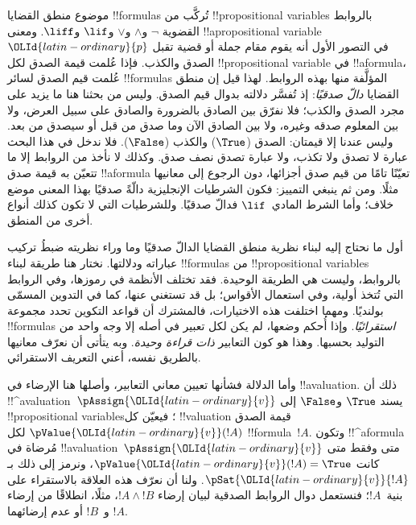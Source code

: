 \documentclass[../../../include/open-logic-section]{subfiles}
\begin{document}


موضوع منطق القضايا !!{formula}s تُركَّب من
!!{propositional variable}s بالروابط القضوية
$\lnot$ و$\land$ و$\lor$ و$\lif$ و$\liff$. ومعنى
!!a{propositional variable}~${\OLId{latin-ordinary}{p}}$ في التصور الأول أنه يقوم مقام جملة أو قضية تقبل الصدق والكذب.
فإذا عُلمت قيمة الصدق لكل !!{propositional variable} في
!!a{formula}، عُلمت قيم الصدق لسائر !!{formula}s المؤلَّفة منها بهذه الروابط. لهذا قيل إن منطق القضايا
\emph{دالّ صدقيًا}: إذ تُفسَّر دلالته بدوال قيم الصدق. وليس من بحثنا هنا ما يزيد على مجرد الصدق والكذب؛ فلا نفرّق بين الصادق بالضرورة والصادق على سبيل العرض، ولا بين المعلوم صدقه وغيره، ولا بين الصادق الآن وما صدق من قبل أو سيصدق من بعد. وليس عندنا إلا قيمتان: الصدق
($\True$) والكذب ($\False$). فلا ندخل في هذا البحث عبارة لا تصدق ولا تكذب، ولا عبارة تصدق نصف صدق.
وكذلك لا نأخذ من الروابط إلا ما تتعيّن به قيمة صدق
!!a{formula} تعيّنًا تامًا من قيم صدق أجزائها، دون الرجوع إلى معانيها مثلًا. ومن ثم ينبغي التمييز: فكون الشرطيات الإنجليزية دالّةً صدقيًا بهذا المعنى موضع خلاف؛ وأما الشرط المادي~$\lif$ فدالّ صدقيًا. وللشرطيات التي لا تكون كذلك أنواع أخرى من المنطق.

أول ما نحتاج إليه لبناء نظرية منطق القضايا الدالّ صدقيًا وما وراء نظريته ضبطُ تركيب عباراته ودلالتها. نختار هنا طريقة لبناء
!!{formula}s من !!{propositional variable}s بالروابط، وليست هي الطريقة الوحيدة. فقد تختلف الأنظمة في رموزها، وفي الروابط التي تُتخذ أولية، وفي استعمال الأقواس؛ بل قد تستغني عنها، كما في التدوين المسمّى بولنديًا.
ومهما اختلفت هذه الاختيارات، فالمشترك أن قواعد التكوين تحدد مجموعة
!!{formula}s \emph{استقرائيًا}. وإذا أُحكم وضعها، لم يكن لكل تعبير في أصله إلا وجه واحد من التوليد بحسبها. وهذا هو كون التعابير
\emph{ذات قراءة وحيدة}. وبه يتأتى أن نعرّف معانيها بالطريق نفسه، أعني التعريف الاستقرائي.

وأما الدلالة فشأنها تعيين معاني التعابير، وأصلها هنا الإرضاء في
!!a{valuation}. ذلك أن !!^a{valuation}~$\pAssign{{\OLId{latin-ordinary}{v}}}$ يسند
$\True$ و$\False$ إلى !!{propositional variable}s؛ فيعيّن كل
!!{valuation} قيمة الصدق $\pValue{{\OLId{latin-ordinary}{v}}}(!A)$ لكل
!!{formula}~$!A$. وتكون !!^a{formula} مُرضاة في
!!a{valuation}~$\pAssign{{\OLId{latin-ordinary}{v}}}$ متى وفقط متى كانت
$\pValue{{\OLId{latin-ordinary}{v}}}(!A) = \True$، ونرمز إلى ذلك بـ
$\pSat{{\OLId{latin-ordinary}{v}}}{!A}$. ولنا أن نعرّف هذه العلاقة بالاستقراء على بنية~$!A$؛ فنستعمل دوال الروابط الصدقية لبيان إرضاء
$!A \land !B$، مثلًا، انطلاقًا من إرضاء $!A$ و~$!B$ أو عدم إرضائهما.
\end{document}
